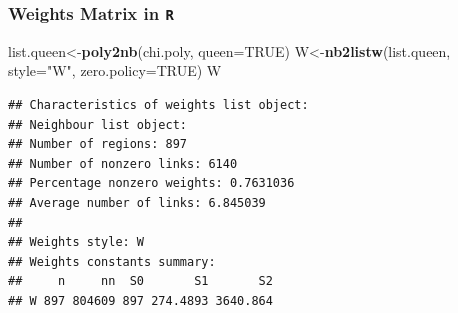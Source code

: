 \documentclass[
  shownotes,
  xcolor={svgnames},
  hyperref={colorlinks,citecolor=DarkBlue,linkcolor=DarkRed,urlcolor=DarkBlue}
   , aspectratio=169]{beamer}
\newenvironment{Shaded}{\begin{snugshade}}{\end{snugshade}}
\newcommand{\DataTypeTok}[1]{\textcolor[rgb]{0.13,0.29,0.53}{#1}}
\newcommand{\KeywordTok}[1]{\textcolor[rgb]{0.13,0.29,0.53}{\textbf{#1}}}
\newcommand{\NormalTok}[1]{#1}
\newcommand{\OtherTok}[1]{\textcolor[rgb]{0.56,0.35,0.01}{#1}}
\newcommand{\StringTok}[1]{\textcolor[rgb]{0.31,0.60,0.02}{#1}}
\begin{document}
\begin{frame}[fragile]
\frametitle{Weights Matrix in \texttt{R}}


\begin{scriptsize}
\begin{Shaded}
\begin{Highlighting}[]
\NormalTok{list.queen\textless{}{-}}\KeywordTok{poly2nb}\NormalTok{(chi.poly, }\DataTypeTok{queen=}\OtherTok{TRUE}\NormalTok{)}
\NormalTok{W\textless{}{-}}\KeywordTok{nb2listw}\NormalTok{(list.queen, }\DataTypeTok{style=}\StringTok{"W"}\NormalTok{, }\DataTypeTok{zero.policy=}\OtherTok{TRUE}\NormalTok{)}
\NormalTok{W}
\end{Highlighting}
\end{Shaded}
\end{scriptsize}

\begin{tiny}
\begin{verbatim}
## Characteristics of weights list object:
## Neighbour list object:
## Number of regions: 897 
## Number of nonzero links: 6140 
## Percentage nonzero weights: 0.7631036 
## Average number of links: 6.845039 
## 
## Weights style: W 
## Weights constants summary:
##     n     nn  S0       S1       S2
## W 897 804609 897 274.4893 3640.864
\end{verbatim}

\end{tiny}

\end{frame}
\end{document}
